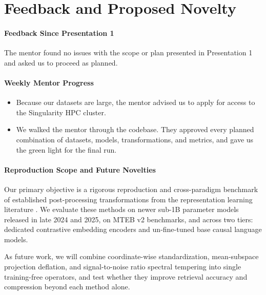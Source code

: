 \section{Feedback and Proposed Novelty}
\label{sec:feedback_novelty}

\paragraph{Feedback Since Presentation 1}
The mentor found no issues with the scope or plan presented in Presentation 1 and asked us to proceed as planned.

\paragraph{Weekly Mentor Progress}
\begin{itemize}
\item Because our datasets are large, the mentor advised us to apply for access to the Singularity HPC cluster.
\item We walked the mentor through the codebase. They approved every planned combination of datasets, models, transformations, and metrics, and gave us the green light for the final run.
\end{itemize}

\paragraph{Reproduction Scope and Future Novelties}
Our primary objective is a rigorous reproduction and cross-paradigm benchmark of established post-processing transformations from the representation learning literature \citep{mu2018all,timkey2021all,su2021whitening,diera2024isotropy,ren2025correcting,li2026spectral}. We evaluate these methods on newer sub-1B parameter models released in late 2024 and 2025, on MTEB v2 benchmarks, and across two tiers: dedicated contrastive embedding encoders and un-fine-tuned base causal language models.

As future work, we will combine coordinate-wise standardization, mean-subspace projection deflation, and signal-to-noise ratio spectral tempering into single training-free operators, and test whether they improve retrieval accuracy and compression beyond each method alone.
